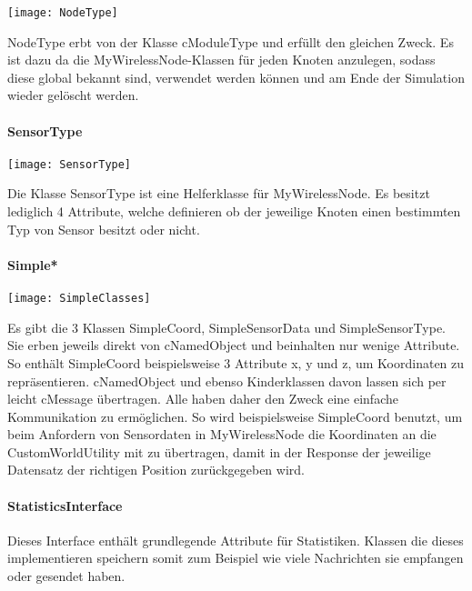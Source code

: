 \begin{center}
\texttt{[image: NodeType]}
\end{center}

NodeType erbt von der Klasse cModuleType und erfüllt den gleichen Zweck. Es ist dazu da die MyWirelessNode-Klassen für jeden Knoten anzulegen, sodass diese global bekannt sind, verwendet werden können und am Ende der Simulation wieder gelöscht werden.

\paragraph{SensorType}

\begin{center}
\texttt{[image: SensorType]}
\end{center}

Die Klasse SensorType ist eine Helferklasse für MyWirelessNode. Es besitzt lediglich 4 Attribute, welche definieren ob der jeweilige Knoten einen bestimmten Typ von Sensor besitzt oder nicht.

\paragraph{Simple*}

\begin{center}
\texttt{[image: SimpleClasses]}
\end{center}

Es gibt die 3 Klassen SimpleCoord, SimpleSensorData und SimpleSensorType.  Sie erben jeweils direkt von cNamedObject und beinhalten nur wenige Attribute. So enthält SimpleCoord beispielsweise 3 Attribute x, y und z, um Koordinaten zu repräsentieren.\newline
cNamedObject und ebenso Kinderklassen davon lassen sich per leicht cMessage übertragen. Alle haben daher den Zweck eine einfache Kommunikation zu ermöglichen. So wird beispielsweise SimpleCoord benutzt, um beim Anfordern von Sensordaten in MyWirelessNode die Koordinaten an die CustomWorldUtility mit zu übertragen, damit in der Response der jeweilige Datensatz der richtigen Position zurückgegeben wird.

\paragraph{StatisticsInterface}

Dieses Interface enthält grundlegende Attribute für Statistiken. Klassen die dieses implementieren speichern somit zum Beispiel wie viele Nachrichten sie empfangen oder gesendet haben.

